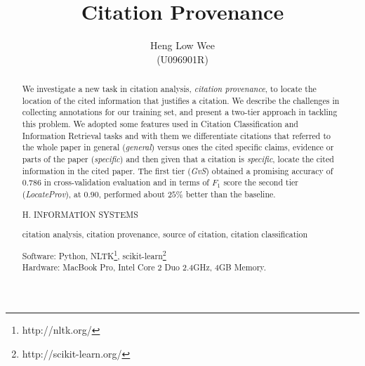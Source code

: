 \documentclass[hyp, 12pt]{socreport}
\begin{document}
\title{Citation Provenance}
\author{Heng Low Wee \\ (U096901R)}
\maketitle
\begin{abstract}
\paragraph{}
We investigate a new task in citation analysis, {\it citation provenance}, to locate the location of the cited information that justifies a citation. We describe the challenges in collecting annotations for our training set, and present a two-tier approach in tackling this problem. We adopted some features used in Citation Classification and Information Retrieval tasks and with them we differentiate citations that referred to the whole paper in general ({\it general}) versus ones the cited specific claims, evidence or parts of the paper ({\it specific}) and then given that a citation is {\it specific}, locate the cited information in the cited paper. The first tier ({\it GvS}) obtained a promising accuracy of $0.786$ in cross-validation evaluation and in terms of $F_1$ score the second tier ({\it LocateProv}), at $0.90$, performed about $25\%$ better than the baseline.

\begin{descriptors}
	\item H. INFORMATION SYSTEMS
\end{descriptors}
\begin{keywords}
	citation analysis, citation provenance, source of citation, citation classification
\end{keywords}
\begin{implement}
\begin{flushleft}
\hspace{5 mm}Software: Python, NLTK\footnote{http://nltk.org/}, scikit-learn\footnote{http://scikit-learn.org/} \nocite{scikit-learn}\\
\hspace{5 mm}Hardware: MacBook Pro, Intel Core 2 Duo 2.4GHz, 4GB Memory.
\end{flushleft}
\end{implement}
\end{abstract}
\end{document}
